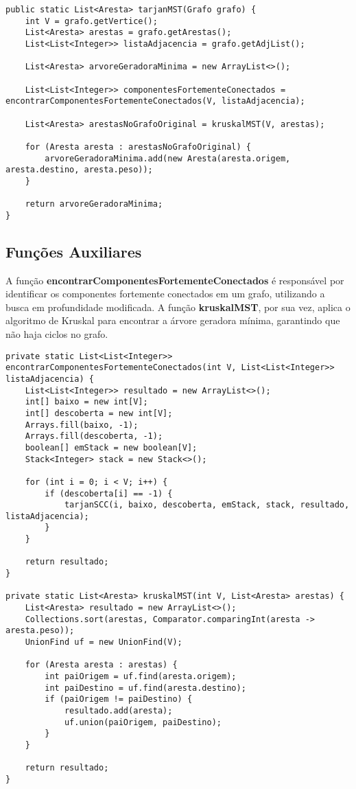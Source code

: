 \begin{verbatim}
public static List<Aresta> tarjanMST(Grafo grafo) {
    int V = grafo.getVertice();
    List<Aresta> arestas = grafo.getArestas();
    List<List<Integer>> listaAdjacencia = grafo.getAdjList();

    List<Aresta> arvoreGeradoraMinima = new ArrayList<>();

    List<List<Integer>> componentesFortementeConectados = encontrarComponentesFortementeConectados(V, listaAdjacencia);

    List<Aresta> arestasNoGrafoOriginal = kruskalMST(V, arestas);

    for (Aresta aresta : arestasNoGrafoOriginal) {
        arvoreGeradoraMinima.add(new Aresta(aresta.origem, aresta.destino, aresta.peso));
    }

    return arvoreGeradoraMinima;
}
\end{verbatim}

\subsection{\esp Funções Auxiliares}

A função \textbf{encontrarComponentesFortementeConectados} é responsável por identificar os componentes fortemente conectados em um grafo, utilizando a busca em profundidade modificada. A função \textbf{kruskalMST}, por sua vez, aplica o algoritmo de Kruskal para encontrar a árvore geradora mínima, garantindo que não haja ciclos no grafo.

\begin{verbatim}
private static List<List<Integer>> encontrarComponentesFortementeConectados(int V, List<List<Integer>> listaAdjacencia) {
    List<List<Integer>> resultado = new ArrayList<>();
    int[] baixo = new int[V];
    int[] descoberta = new int[V];
    Arrays.fill(baixo, -1);
    Arrays.fill(descoberta, -1);
    boolean[] emStack = new boolean[V];
    Stack<Integer> stack = new Stack<>();

    for (int i = 0; i < V; i++) {
        if (descoberta[i] == -1) {
            tarjanSCC(i, baixo, descoberta, emStack, stack, resultado, listaAdjacencia);
        }
    }

    return resultado;
}

private static List<Aresta> kruskalMST(int V, List<Aresta> arestas) {
    List<Aresta> resultado = new ArrayList<>();
    Collections.sort(arestas, Comparator.comparingInt(aresta -> aresta.peso));
    UnionFind uf = new UnionFind(V);

    for (Aresta aresta : arestas) {
        int paiOrigem = uf.find(aresta.origem);
        int paiDestino = uf.find(aresta.destino);
        if (paiOrigem != paiDestino) {
            resultado.add(aresta);
            uf.union(paiOrigem, paiDestino);
        }
    }

    return resultado;
}
\end{verbatim}

